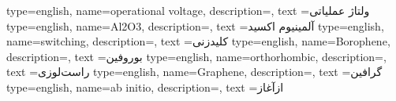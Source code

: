 {
    type=english,
    name={operational voltage},
    description={},
    text ={ولتاژ عملیاتی}
}
{
    type=english,
    name={Al2O3},
    description={},
    text ={آلمینیوم اکسید}
}
{
    type=english,
    name={switching},
    description={},
    text ={کلیدزنی}
}
{
    type=english,
    name={Borophene},
    description={},
    text ={بوروفین}
}
{
    type=english,
    name={orthorhombic},
    description={},
    text ={راست‌لوزی}
}
{
    type=english,
    name={Graphene},
    description={},
    text ={گرافین}
}
{
    type=english,
    name={ab initio},
    description={},
    text ={از‌آغاز}
}
